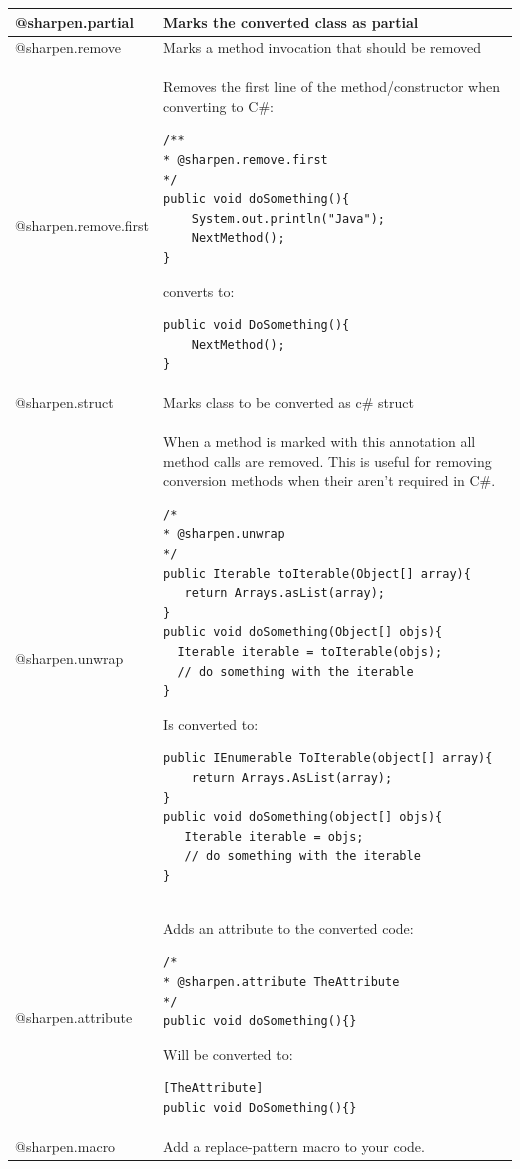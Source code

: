 {\begin{longtable}{|p{}|p{}|}
@sharpen.partial & Marks the converted class as partial \\ \hline
@sharpen.remove & Marks a method invocation that should be removed \\ \hline
@sharpen.remove.first & Removes the first line of the method/constructor when converting to C\#:\par \begin{lstlisting}
/**
* @sharpen.remove.first
*/
public void doSomething(){
    System.out.println("Java");
    NextMethod();
}
\end{lstlisting}\par converts to:\par \begin{lstlisting}
public void DoSomething(){
    NextMethod();
}
\end{lstlisting} \\ \hline
@sharpen.struct & Marks class to be converted as c\# struct \\ \hline
@sharpen.unwrap & When a method is marked with this annotation \newline{}all method calls are removed. This is useful for removing conversion methods when their aren't required in C\#.\par \begin{lstlisting}
/*
* @sharpen.unwrap
*/
public Iterable toIterable(Object[] array){
   return Arrays.asList(array);
}
public void doSomething(Object[] objs){
  Iterable iterable = toIterable(objs);
  // do something with the iterable
}
\end{lstlisting}\par Is converted to:\par \begin{lstlisting}
public IEnumerable ToIterable(object[] array){
    return Arrays.AsList(array);
}
public void doSomething(object[] objs){
   Iterable iterable = objs;
   // do something with the iterable
}
\end{lstlisting} \\ \hline
@sharpen.attribute & Adds an attribute to the converted code:\par \begin{lstlisting}
/*
* @sharpen.attribute TheAttribute
*/
public void doSomething(){}
\end{lstlisting}\par Will be converted to:\par \begin{lstlisting}
[TheAttribute]
public void DoSomething(){}
\end{lstlisting} \\ \hline
@sharpen.macro & Add a replace-pattern macro to your code. \\ \hline
\end{longtable}}


